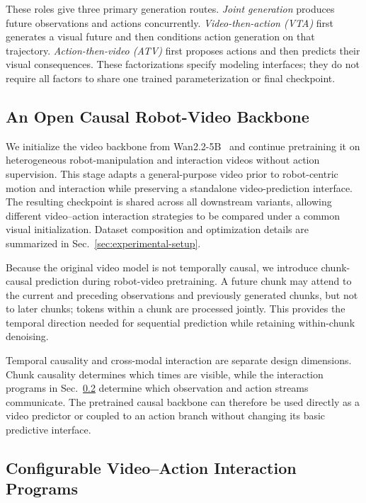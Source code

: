 These roles give three primary generation routes.
\emph{Joint generation} produces future observations and actions
concurrently. \emph{Video-then-action (VTA)} first generates a visual
future and then conditions action generation on that trajectory.
\emph{Action-then-video (ATV)} first proposes actions and then predicts
their visual consequences. These factorizations specify modeling
interfaces; they do not require all factors to share one trained
parameterization or final checkpoint.

\subsection{An Open Causal Robot-Video Backbone}
\label{sec:causal-video-backbone}

We initialize the video backbone from Wan2.2-5B~\cite{wan2025wan} and
continue pretraining it on heterogeneous robot-manipulation and interaction
videos without action supervision. This stage adapts a general-purpose video
prior to robot-centric motion and interaction while preserving a standalone
video-prediction interface. The resulting checkpoint is shared across all
downstream \ours variants, allowing different video--action interaction
strategies to be compared under a common visual initialization. Dataset
composition and optimization details are summarized in
Sec.~\ref{sec:experimental-setup}.

Because the original video model is not temporally causal, we introduce
chunk-causal prediction during robot-video pretraining. A future chunk may
attend to the current and preceding observations and previously generated
chunks, but not to later chunks; tokens within a chunk are processed
jointly. This provides the temporal direction needed for sequential
prediction while retaining within-chunk denoising.

Temporal causality and cross-modal interaction are separate design
dimensions. Chunk causality determines which times are visible, while the
interaction programs in Sec.~\ref{sec:interaction-programs} determine which
observation and action streams communicate. The pretrained causal backbone
can therefore be used directly as a video predictor or coupled to an action
branch without changing its basic predictive interface.

\subsection{Configurable Video--Action Interaction Programs}
\label{sec:interaction-programs}
\label{sec:framework-architecture}

